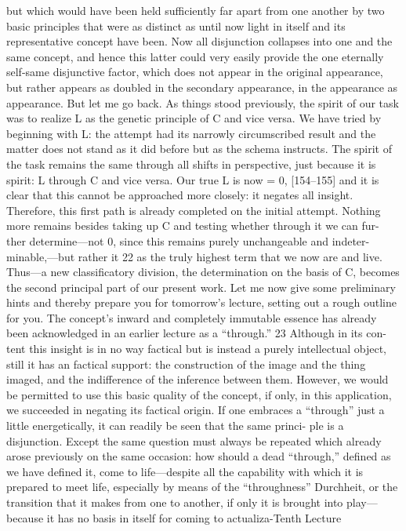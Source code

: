 but which would have been held sufficiently far apart from one another by
two basic principles that were as distinct as until now light in itself and its
representative concept have been. Now all disjunction collapses into one and
the same concept, and hence this latter could very easily provide the one
eternally self-same disjunctive factor, which does not appear in the original
appearance, but rather appears as doubled in the secondary appearance, in
the appearance as appearance.
But let me go back. As things stood previously, the spirit of our task was
to realize L as the genetic principle of C and vice versa. We have tried by
beginning with L: the attempt had its narrowly circumscribed result and the
matter does not stand as it did before but as the schema instructs. The spirit
of the task remains the same through all shifts in perspective, just because it
is spirit: L through C and vice versa. Our true L is now = 0, [154–155] and it is
clear that this cannot be approached more closely: it negates all insight.
Therefore, this first path is already completed on the initial attempt. Nothing
more remains besides taking up C and testing whether through it we can fur-
ther determine—not 0, since this remains purely unchangeable and indeter-
minable,—but rather it 22 as the truly highest term that we now are and live.
Thus—a new classificatory division, the determination on the basis of C,
becomes the second principal part of our present work.
Let me now give some preliminary hints and thereby prepare you for
tomorrow’s lecture, setting out a rough outline for you.
The concept’s inward and completely immutable essence has already
been acknowledged in an earlier lecture as a “through.” 23 Although in its con-
tent this insight is in no way factical but is instead a purely intellectual object,
still it has an factical support: the construction of the image and the thing
imaged, and the indifference of the inference between them. However, we
would be permitted to use this basic quality of the concept, if only, in this
application, we succeeded in negating its factical origin. If one embraces a
“through” just a little energetically, it can readily be seen that the same princi-
ple is a disjunction. Except the same question must always be repeated which
already arose previously on the same occasion: how should a dead “through,”
defined as we have defined it, come to life—despite all the capability with
which it is prepared to meet life, especially by means of the “throughness”
{Durchheit}, or the transition that it makes from one to another, if only it is
brought into play—because it has no basis in itself for coming to actualiza-Tenth Lecture
